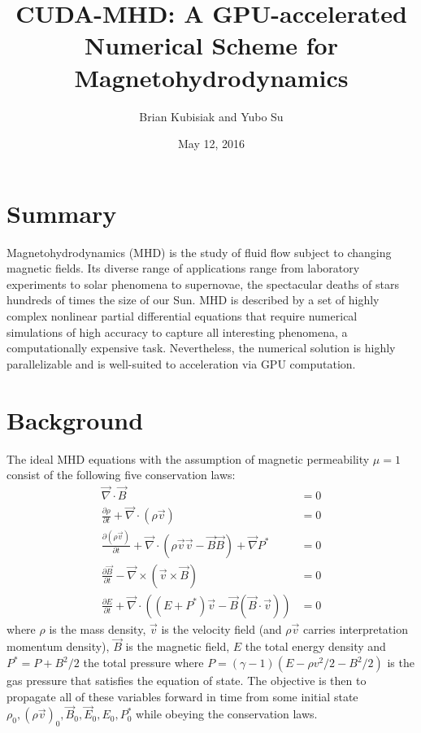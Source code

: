 \documentclass[10pt,twocolumn]{article}
\newcommand{\pd}[2]{\frac{\partial#1}{\partial#2}}
\begin{document}
\pagestyle{fancy}
\cfoot{\thepage/\pageref{LastPage}}

\title{CUDA-MHD\@: A GPU-accelerated Numerical Scheme for Magnetohydrodynamics}
\author{Brian Kubisiak and Yubo Su}
\date{May 12, 2016}
\maketitle

\section{Summary}

Magnetohydrodynamics (MHD) is the study of fluid flow subject to changing
magnetic fields. Its diverse range of applications range from laboratory
experiments to solar phenomena to supernovae, the spectacular deaths of stars
hundreds of times the size of our Sun. MHD is described by a set of highly
complex nonlinear partial differential equations that require numerical
simulations of high accuracy to capture all interesting phenomena, a
computationally expensive task. Nevertheless, the numerical solution is highly
parallelizable and is well-suited to acceleration via GPU computation.

\section{Background}

The ideal MHD equations with the assumption of magnetic permeability $\mu = 1$
consist of the following five conservation laws:
\begin{align}
    \vec{\nabla} \cdot \vec{B} &= 0 \\
    \pd{\rho}{t} + \vec{\nabla} \cdot \left( \rho \vec{v} \right) &= 0 \\
    \pd{(\rho \vec{v})}{t} + \vec{\nabla} \cdot \left( \rho \vec{v}\vec{v} -
    \vec{B} \vec{B} \right) + \vec{\nabla}P^* &= 0 \\
    \pd{\vec{B}}{t} - \vec{\nabla} \times \left( \vec{v} \times \vec{B} \right)
    &= 0 \\
    \pd{E}{t} + \vec{\nabla} \cdot \left( (E + P^*)\vec{v} - \vec{B}\left(
    \vec{B} \cdot \vec{v} \right) \right) &= 0
\end{align}
where $\rho$ is the mass density, $\vec{v}$ is the velocity field (and $\rho
\vec{v}$ carries interpretation momentum density), $\vec{B}$ is the magnetic
field, $E$ the total energy density and $P^* = P + {B^2}/{2}$ the total
pressure where $P = (\gamma - 1)\left( E - \rho {v^2} / {2} - {B^2} / {2}
\right)$ is the gas pressure that satisfies the equation of state. The objective
is then to propagate all of these variables forward in time from some initial
state $\rho_0, {(\rho \vec{v})}_0, \vec{B}_0, \vec{E}_0, E_0, P^*_0$ while
obeying the conservation laws.
\end{document}
